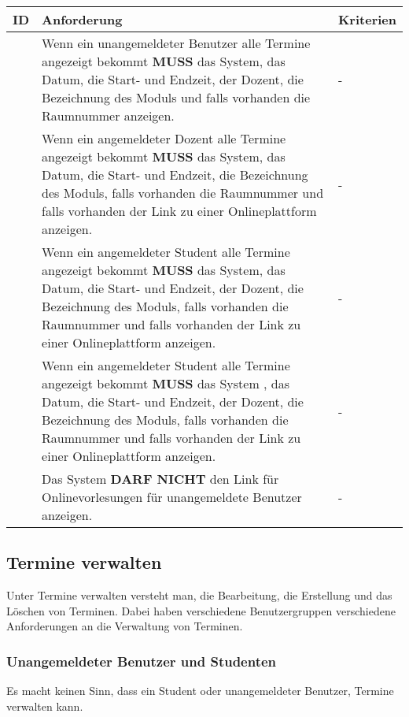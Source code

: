 \begin{tabular} {|p{}|p{}|p{}|}
	\hline
	ID & Anforderung & Kriterien \\
	\hline
	\printfreqnr
	& Wenn ein unangemeldeter Benutzer alle Termine angezeigt bekommt \textbf{MUSS} das System, das Datum, die Start- und Endzeit, der Dozent, die Bezeichnung des Moduls und falls vorhanden die Raumnummer anzeigen. 
	& - \\
	\hline
	\printfreqnr
	& Wenn ein angemeldeter Dozent alle Termine angezeigt bekommt \textbf{MUSS} das System, das Datum, die Start- und Endzeit, die Bezeichnung des Moduls, falls vorhanden die Raumnummer und falls vorhanden der Link zu einer Onlineplattform anzeigen. 
	& - \\
	\hline
	\printfreqnr
	& Wenn ein angemeldeter Student alle Termine angezeigt bekommt \textbf{MUSS} das System, das Datum, die Start- und Endzeit, der Dozent, die Bezeichnung des Moduls, falls vorhanden die Raumnummer und falls vorhanden der Link zu einer Onlineplattform anzeigen. 
	& - \\
	\hline
	\printfreqnr
	& Wenn ein angemeldeter Student alle Termine angezeigt bekommt \textbf{MUSS} das System , das Datum, die Start- und Endzeit, der Dozent, die Bezeichnung des Moduls, falls vorhanden die Raumnummer und falls vorhanden der Link zu einer Onlineplattform anzeigen.
	& - \\
	\hline
	\printfreqnr
	& Das System \textbf{DARF NICHT} den Link für Onlinevorlesungen für unangemeldete Benutzer anzeigen. 
	& - \\
	\hline
\end{tabular}

\newpage

\subsection{Termine verwalten}
Unter Termine verwalten versteht man, die Bearbeitung, die Erstellung und das Löschen von Terminen. Dabei haben verschiedene Benutzergruppen verschiedene Anforderungen an die Verwaltung von Terminen.

\vspace{12pt}

\subsubsection{Unangemeldeter Benutzer und Studenten}
Es macht keinen Sinn, dass ein Student oder unangemeldeter Benutzer, Termine verwalten kann.

